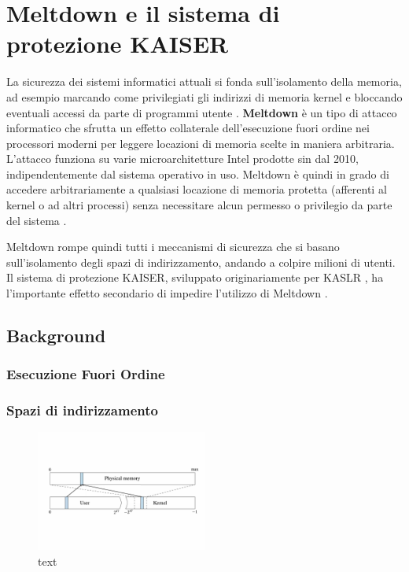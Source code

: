 \chapter{Meltdown e il sistema di protezione KAISER}
La sicurezza dei sistemi informatici attuali si fonda sull'isolamento della memoria,
ad esempio marcando come privilegiati gli indirizzi di memoria kernel e bloccando eventuali
accessi da parte di programmi utente \cite{lettieri:protezione}. 
\textbf{Meltdown} è un tipo di attacco informatico che sfrutta un effetto
collaterale dell'esecuzione fuori ordine nei processori moderni per leggere locazioni di memoria scelte in maniera
arbitraria. L'attacco funziona su varie microarchitetture Intel prodotte sin dal 2010, indipendentemente dal sistema
operativo in uso. Meltdown è quindi in grado di accedere arbitrariamente a qualsiasi locazione di memoria protetta
(afferenti al kernel o ad altri processi) senza necessitare alcun permesso o privilegio da parte del
sistema \cite{lipp:meltdown}.

Meltdown rompe quindi tutti i meccanismi di sicurezza che si basano sull'isolamento degli spazi di indirizzamento, andando a colpire milioni di utenti. Il sistema di protezione KAISER, sviluppato originariamente per KASLR \cite{gruss:kaslr}, ha l'importante effetto secondario di impedire l'utilizzo di Meltdown \cite{lipp:meltdown}.


\section{Background}

\subsection{Esecuzione Fuori Ordine}
\label{sec:esecuzione-fuori-ordine}

\subsection{Spazi di indirizzamento}
\label{sec:spazi-di-indirizzamento}
\begin{figure}
	\centering
	\includegraphics[width=0.5\textwidth]{"img/memoria-fisica.pdf"}
	\caption{text} %
	\label{fig:memoria-fisica}
\end{figure}


